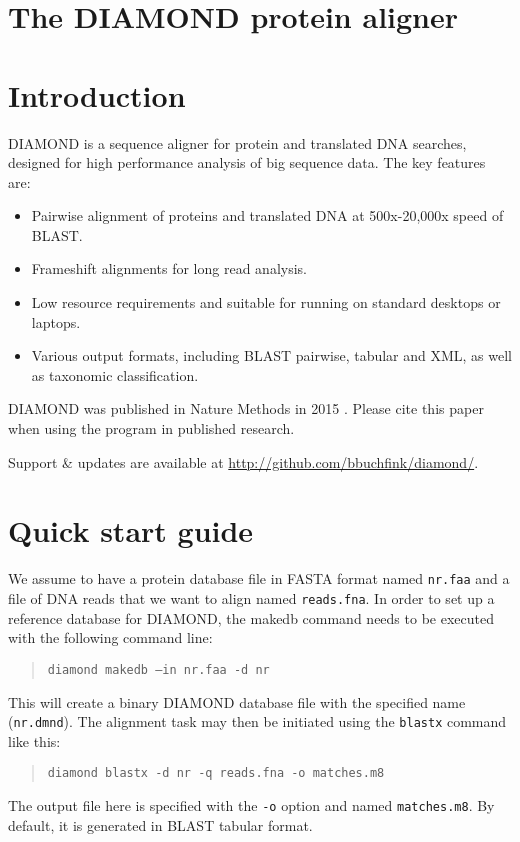 \documentclass[11pt]{article}
\begin{document}
\section*{\Large{The DIAMOND protein aligner}}

\section*{Introduction}
DIAMOND is a sequence aligner for protein and translated DNA searches, designed for high performance analysis of big sequence data. The key features are:
\begin{itemize}
\item Pairwise alignment of proteins and translated DNA at 500x-20,000x speed of BLAST.
\item Frameshift alignments for long read analysis.
\item Low resource requirements and suitable for running on standard desktops or laptops.
\item Various output formats, including BLAST pairwise, tabular and XML, as well as taxonomic classification.
\end{itemize}
DIAMOND was published in Nature Methods in 2015 \cite{Buchfink2015}. Please cite this paper when using the program in published research.

Support \& updates are available at \url{http://github.com/bbuchfink/diamond/}.

\section{Quick start guide}

We assume to have a protein database file in FASTA format named \texttt{nr.faa} and a file of DNA reads that we want to align named \texttt{reads.fna}. In order to set up a reference database for DIAMOND, the makedb command needs to be executed with the following command line:
\begin{quote}
\texttt{diamond makedb --in nr.faa -d nr}
\end{quote}
This will create a binary DIAMOND database file with the specified name (\texttt{nr.dmnd}). The alignment task may then be initiated using the \texttt{blastx} command like this:
\begin{quote}
\texttt{diamond blastx -d nr -q reads.fna -o matches.m8}
\end{quote}
The output file here is specified with the \texttt{-o} option and named \texttt{matches.m8}. By default, it is generated in BLAST tabular format.
\end{document}
